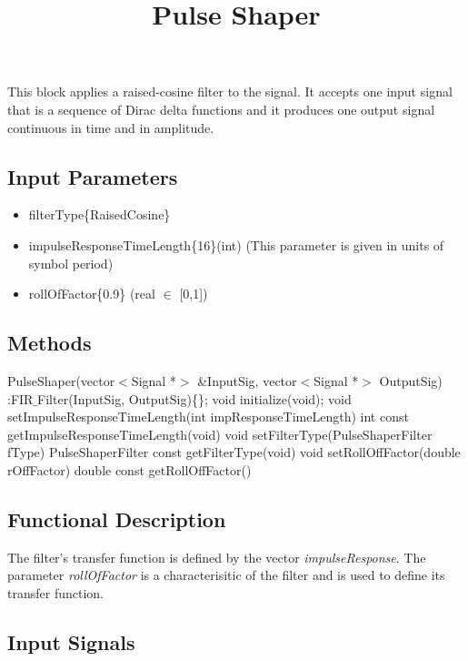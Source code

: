 \documentclass[a4paper]{article}
\title{Pulse Shaper}
\begin{document}
\maketitle

This block applies a raised-cosine filter to the signal. It accepts one input signal that is a sequence of Dirac delta functions and it produces one output signal continuous in time and in amplitude.

\subsection*{Input Parameters}

\begin{itemize}
	\item filterType\{RaisedCosine\} \linebreak
	\item impulseResponseTimeLength\{16\}\linebreak (int) 
	\linebreak (This parameter is given in units of symbol period)
	\item rollOfFactor\{0.9\} \linebreak
	(real $\in$ [0,1])
\end{itemize}

\subsection*{Methods}

PulseShaper(vector$<$Signal *$>$ \&InputSig, vector$<$Signal *$>$ OutputSig) :FIR$\_$Filter(InputSig, OutputSig)\{\};
\bigbreak	
void initialize(void);
\bigbreak	
void setImpulseResponseTimeLength(int impResponseTimeLength)
\bigbreak
int const getImpulseResponseTimeLength(void)
\bigbreak	
void setFilterType(PulseShaperFilter fType)
\bigbreak
PulseShaperFilter const getFilterType(void)
\bigbreak	
void setRollOffFactor(double rOffFactor)
\bigbreak
double const getRollOffFactor()

\subsection*{Functional Description}

The filter's transfer function is defined by the vector \textit{impulseResponse}. The parameter \textit{rollOfFactor} is a characterisitic of the filter and is used to define its transfer function.

\subsection*{Input Signals}
\end{document}
